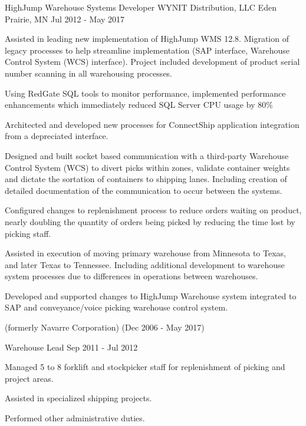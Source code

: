 \begin{cventries}
  \cventry
    {HighJump Warehouse Systems Developer}
    {WYNIT Distribution, LLC}
    {Eden Prairie, MN}
    {Jul 2012 - May 2017}
    {
      \begin{cvitems}
       \item {Assisted in leading new implementation of HighJump WMS 12.8. Migration of legacy processes to help streamline implementation (SAP interface, Warehouse Control System (WCS) interface).  Project included development of product serial number scanning in all warehousing processes.}
       \item {Using RedGate SQL tools to monitor performance, implemented performance enhancements which immediately reduced SQL Server CPU usage by 80\%}
       \item {Architected and developed new processes for ConnectShip application integration from a depreciated interface.}
       \item {Designed and built socket based communication with a third-party Warehouse Control System (WCS) to divert picks within zones, validate container weights and dictate the sortation of containers to shipping lanes. Including creation of detailed documentation of the communication to occur between the systems.}
       \item {Configured changes to replenishment process to reduce orders waiting on product, nearly doubling the quantity of orders being picked by reducing the time lost by picking staff.}
       \item {Assisted in execution of moving primary warehouse from Minnesota to Texas, and later Texas to Tennessee. Including additional development to warehouse system processes due to differences in operations between warehouses.}
       \item {Developed and supported changes to HighJump Warehouse system integrated to SAP and conveyance/voice picking warehouse control system.}
      \end{cvitems}
    }
   {(formerly Navarre Corporation)}
   {(Dec 2006 - May 2017)}





  \cventry
    {Warehouse Lead}
    {}
    {}
    {Sep 2011 - Jul 2012}
    {
      \begin{cvitems}
       \item {Managed 5 to 8 forklift and stockpicker staff for replenishment of picking and project areas.}
       \item {Assisted in specialized shipping projects.}
       \item {Performed other administrative duties.}
      \end{cvitems}
    }{}{}





\end{cventries}
